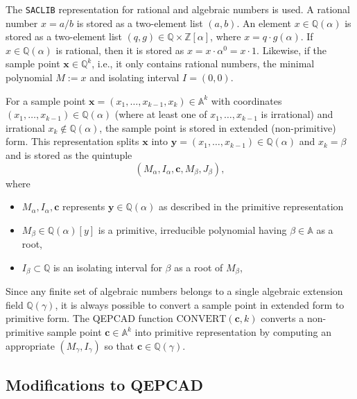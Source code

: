 \documentclass[
]{book}
\providecommand{\tightlist}{%
  \setlength{\itemsep}{0pt}\setlength{\parskip}{0pt}}
\theoremstyle{definition}
\theoremstyle{definition}
\theoremstyle{definition}
\theoremstyle{definition}
\theoremstyle{remark}
\begin{document}
The \texttt{SACLIB} representation for rational and algebraic numbers is used. A rational number \(x = a/b\) is stored as a two-element list \((a,b)\). An element \(x \in \mathbb{Q}(\alpha)\) is stored as a two-element list \((q, g) \in \mathbb{Q}\times \mathbb{Z}[\alpha]\), where \(x = q \cdot g(\alpha)\). If \(x \in \mathbb{Q}(\alpha)\) is rational, then it is stored as \(x = x \cdot \alpha^0 = x \cdot 1\). Likewise, if the sample point \(\mathbf{x} \in \mathbb{Q}^k\), i.e., it only contains rational numbers, the minimal polynomial \(M := x\) and isolating interval \(I = (0,0)\).

For a sample point \(\mathbf{x} = (x_1,\ldots,x_{k-1},x_k) \in \mathbb{A}^k\) with coordinates \((x_1,\ldots,x_{k-1}) \in \mathbb{Q}(\alpha)\) (where at least one of \(x_1,\ldots,x_{k-1}\) is irrational) and irrational \(x_k \not \in \mathbb{Q}(\alpha)\), the sample point is stored in extended (non-primitive) form.
This representation splits \(\mathbf{x}\) into \(\mathbf{y} = (x_1,\ldots,x_{k-1}) \in \mathbb{Q}(\alpha)\) and \(x_k = \beta\) and is stored as the quintuple
\[
(M_\alpha, I_\alpha, \mathbf{c}, M_\beta, J_\beta),
\]
where

\begin{itemize}
\tightlist
\item
  \(M_\alpha, I_\alpha, \mathbf{c}\) represents \(\mathbf{y} \in \mathbb{Q}(\alpha)\) as described in the primitive representation
\item
  \(M_\beta \in \mathbb{Q}(\alpha)[y]\) is a primitive, irreducible polynomial having \(\beta \in \mathbb{A}\) as a root,
\item
  \(I_\beta \subset \mathbb{Q}\) is an isolating interval for \(\beta\) as a root of \(M_\beta\),
\end{itemize}

Since any finite set of algebraic numbers belongs to a single algebraic extension field \(\mathbb{Q}(\gamma)\), it is always possible to convert a sample point in extended form to primitive form. The QEPCAD function \({\mathrm{CONVERT}}(\mathbf{c}, k)\) converts a non-primitive sample point \(\mathbf{c} \in \mathbb{A}^k\) into primitive representation by computing an appropriate \((M_\gamma, I_\gamma)\) so that \(\mathbf{c} \in \mathbb{Q}(\gamma)\).

\hypertarget{modifications-to-qepcad}{%
\subsection{Modifications to QEPCAD}\label{modifications-to-qepcad}}
\end{document}
